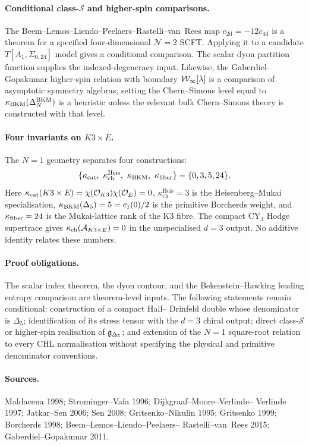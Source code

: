 \paragraph{Conditional class-$\mathcal S$ and higher-spin comparisons.}
The Beem--Lemos--Liendo--Peelaers--Rastelli--van~Rees map
$c_{\mathrm{2d}}=-12c_{\mathrm{4d}}$ is a theorem for a specified
four-dimensional $\mathcal N=2$ SCFT. Applying it to a candidate
$T[A_1,\Sigma_{0,24}]$ model gives a conditional comparison. The scalar
dyon partition function supplies the indexed-degeneracy input. Likewise, the
Gaberdiel--Gopakumar higher-spin relation with boundary
$\mathcal{W}_\infty[\lambda]$ is a comparison of asymptotic symmetry algebras; setting
the Chern--Simons level equal to $\kappa_{\mathrm{BKM}}(\Delta^{\mathrm{BKM}}_N)$ is a heuristic unless
the relevant bulk Chern--Simons theory is constructed with that level.

\paragraph{Four invariants on $K3\times E$.}
The $N=1$ geometry separates four constructions:
\[
  \{\kcat,\ \kappa_{\mathrm{ch}}^{\mathrm{Heis}},\ \kBKM,\ \kfib\}
  =
  \{0,3,5,24\}.
\]
Here $\kappa_{\mathrm{cat}}(K3\times E)=\chi(\mathcal O_{K3})\chi(\mathcal O_E)=0$,
$\kappa_{\mathrm{ch}}^{\mathrm{Heis}}=3$ is the Heisenberg--Mukai
specialisation, $\kappa_{\mathrm{BKM}}(\Delta_5)=5=c_1(0)/2$ is the primitive
Borcherds weight, and $\kappa_{\mathrm{fiber}}=24$ is the Mukai-lattice rank of the K3
fibre. The compact CY$_3$ Hodge supertrace gives
$\kappa_{\mathrm{ch}}(\mathcal A_{K3\times E})=0$ in the unspecialised $d=3$ output.
No additive identity relates these numbers.

\paragraph{Proof obligations.}
The scalar index theorem, the dyon contour, and the Bekenstein--Hawking
leading entropy comparison are theorem-level inputs. The following
statements remain conditional: construction of a compact Hall--
Drinfeld double whose denominator is $\Delta_5$; identification of its
stress tensor with the $d=3$ chiral output; direct class-$\mathcal S$
or higher-spin realisation of $\mathfrak{g}_{\Delta_5}$; and extension of the
$N=1$ square-root relation to every CHL normalisation without specifying
the physical and primitive denominator conventions.

\paragraph{Sources.}
Maldacena 1998; Strominger--Vafa 1996; Dijkgraaf--Moore--Verlinde--
Verlinde 1997; Jatkar--Sen 2006; Sen 2008; Gritsenko--Nikulin 1995;
Gritsenko 1999; Borcherds 1998; Beem--Lemos--Liendo--Peelaers--
Rastelli--van~Rees 2015; Gaberdiel--Gopakumar 2011.
